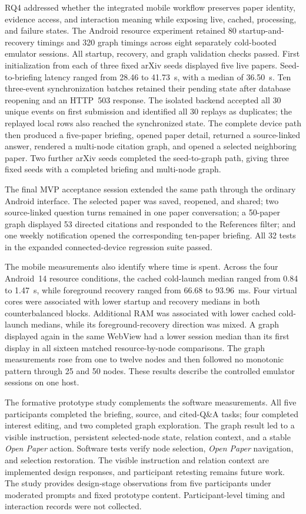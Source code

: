 RQ4 addressed whether the integrated mobile workflow preserves paper identity, evidence access, and interaction meaning while exposing live, cached, processing, and failure states.
The Android resource experiment retained 80 startup-and-recovery timings and
320 graph timings across eight separately cold-booted emulator sessions. All
startup, recovery, and graph validation checks passed.
First initialization from each of three fixed arXiv seeds displayed five live
papers. Seed-to-briefing latency ranged from 28.46 to 41.73~s, with a median
of 36.50~s.
Ten three-event synchronization batches retained their pending state after
database reopening and an HTTP~503 response. The isolated backend accepted all 30 unique
events on first submission and identified all 30 replays as duplicates; the
replayed local rows also reached the synchronized state.
The complete device path then produced a five-paper briefing, opened paper detail, returned a source-linked answer, rendered a multi-node citation graph, and opened a selected neighboring paper.
Two further arXiv seeds completed the seed-to-graph path, giving three fixed
seeds with a completed briefing and multi-node graph.

The final MVP acceptance session extended the same path through the ordinary
Android interface. The selected paper was saved, reopened, and shared; two
source-linked question turns remained in one paper conversation; a 50-paper
graph displayed 53 directed citations and responded to the References filter;
and one weekly notification opened the corresponding ten-paper briefing. All
32 tests in the expanded connected-device regression suite passed.

The mobile measurements also identify where time is spent.
Across the four Android~14 resource conditions, the cached cold-launch median
ranged from 0.84 to 1.47~s, while foreground recovery ranged from 66.68 to
93.96~ms. Four virtual cores were associated with lower startup and recovery
medians in both counterbalanced blocks. Additional RAM was associated with
lower cached cold-launch medians, while its foreground-recovery direction was
mixed. A graph displayed again in the same WebView had a lower session median
than its first display in all sixteen matched resource-by-node comparisons.
The graph measurements rose from one to twelve nodes and then followed no
monotonic pattern through 25 and 50 nodes. These results describe the controlled
emulator sessions on one host.

The formative prototype study complements the software measurements.
All five participants completed the briefing, source, and cited-Q\&A tasks; four completed interest editing, and two completed graph exploration.
The graph result led to a visible instruction, persistent selected-node state, relation context, and a stable \emph{Open Paper} action.
Software tests verify node selection, \emph{Open Paper} navigation, and
selection restoration. The visible instruction and relation context are
implemented design responses, and participant retesting remains future work.
The study provides design-stage observations from five participants under
moderated prompts and fixed prototype content. Participant-level timing and
interaction records were not collected.

